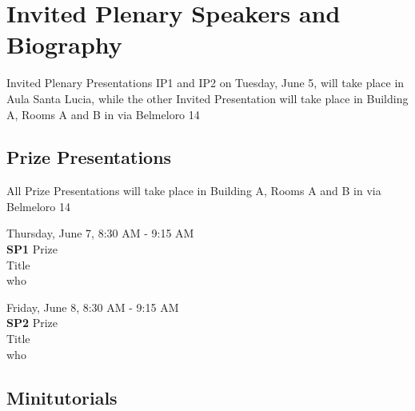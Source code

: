 \documentclass[10pt, a4paper]{book}
\begin{document}
\pagestyle{fancy} %






\chapter*{Invited Plenary Speakers and Biography}
{\small{Invited Plenary Presentations  IP1 and IP2 on Tuesday, June 5, will take place in Aula Santa Lucia, while the other Invited Presentation will take place in Building A, Rooms A and B in via Belmeloro 14}}



\newpage
\section*{Prize Presentations}
{\small{All Prize Presentations will take place in Building A, Rooms A and B in via Belmeloro 14}}
\vspace{2cm}
\begin{center}
Thursday, June 7, 8:30 AM - 9:15 AM \\
\textbf{SP1} Prize\\
Title\\
who\\
\end{center}
\vspace{2cm}
\begin{center}
Friday, June 8, 8:30 AM - 9:15 AM \\
\textbf{SP2} Prize\\
Title\\
who\\
\end{center}


\newpage
\section*{Minitutorials}
\end{document}

